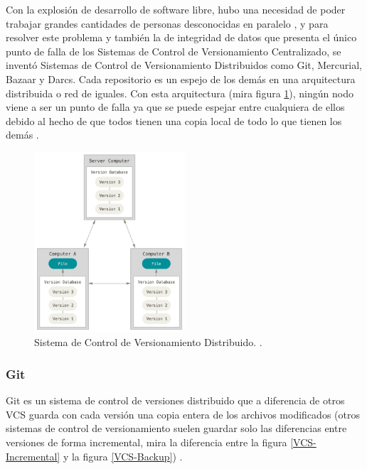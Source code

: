 Con la explosión de desarrollo de software libre, hubo una necesidad de poder trabajar grandes cantidades de personas desconocidas en paralelo \citep{raymond1999cathedral}, y para resolver este problema y también la de integridad de datos que presenta el único punto de falla de los Sistemas de Control de Versionamiento Centralizado, se inventó Sistemas de Control de Versionamiento Distribuidos como Git, Mercurial, Bazaar y Darcs. Cada repositorio es un espejo de los demás en una arquitectura distribuida o red de iguales. Con esta arquitectura (mira figura \ref{DVCS}), ningún nodo viene a ser un punto de falla ya que se puede espejar entre cualquiera de ellos debido al hecho de que todos tienen una copia local de todo lo que tienen los demás \citep{PROGIT-Git-VCS}. 

\begin{figure}
  \begin{center}
      \includegraphics[width=0.5\textwidth]{Figures/dvcs.png}
  \end{center}
  \caption{Sistema de Control de Versionamiento Distribuido. \citep{PROGIT-Git-VCS}.}
  \label{DVCS}
\end{figure}

\subsubsection{Git}
Git es un sistema de control de versiones distribuido que a diferencia de otros VCS guarda con cada versión una copia entera de los archivos modificados (otros sistemas de control de versionamiento suelen guardar solo las diferencias entre versiones de forma incremental, mira la diferencia entre la figura \ref{VCS-Incremental} y la figura \ref{VCS-Backup}) \citep{PROGIT-Git-Intro}.


